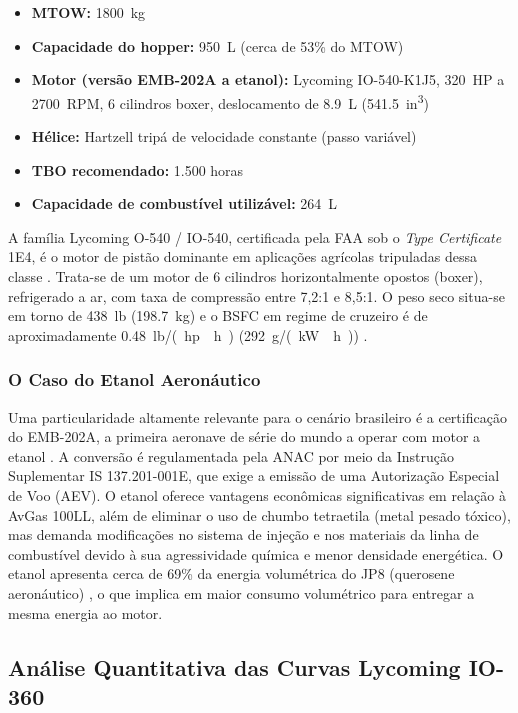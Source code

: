 \documentclass[a4paper,12pt]{article}
\begin{document}
\begin{itemize}
    \item \textbf{MTOW:} \SI{1800}{kg}
    \item \textbf{Capacidade do hopper:} \SI{950}{L} (cerca de 53\% do MTOW)
    \item \textbf{Motor (versão EMB-202A a etanol):} Lycoming IO-540-K1J5, \SI{320}{HP} a \SI{2700}{RPM}, 6 cilindros boxer, deslocamento de \SI{8.9}{L} (\SI{541.5}{in^3})
    \item \textbf{Hélice:} Hartzell tripá de velocidade constante (passo variável)
    \item \textbf{TBO recomendado:} 1.500 horas
    \item \textbf{Capacidade de combustível utilizável:} \SI{264}{L}
\end{itemize}

A família Lycoming O-540 / IO-540, certificada pela FAA sob o \textit{Type Certificate} 1E4, é o motor de pistão dominante em aplicações agrícolas tripuladas dessa classe \cite{lycomingmanual}. Trata-se de um motor de 6 cilindros horizontalmente opostos (boxer), refrigerado a ar, com taxa de compressão entre 7{,}2:1 e 8{,}5:1. O peso seco situa-se em torno de \SI{438}{lb} (\SI{198.7}{kg}) e o BSFC em regime de cruzeiro é de aproximadamente \SI{0.48}{lb/(hp \cdot h)} (\SI{292}{g/(kW \cdot h)}) \cite{lycomingmanual}.

\subsubsection{O Caso do Etanol Aeronáutico}

Uma particularidade altamente relevante para o cenário brasileiro é a certificação do EMB-202A, a primeira aeronave de série do mundo a operar com motor a etanol \cite{embraer202}. A conversão é regulamentada pela ANAC por meio da Instrução Suplementar IS 137.201-001E, que exige a emissão de uma Autorização Especial de Voo (AEV). O etanol oferece vantagens econômicas significativas em relação à AvGas 100LL, além de eliminar o uso de chumbo tetraetila (metal pesado tóxico), mas demanda modificações no sistema de injeção e nos materiais da linha de combustível devido à sua agressividade química e menor densidade energética. O etanol apresenta cerca de 69\% da energia volumétrica do JP8 (querosene aeronáutico) \cite{nas_army_fuels}, o que implica em maior consumo volumétrico para entregar a mesma energia ao motor.

\subsection{Análise Quantitativa das Curvas Lycoming IO-360}
\label{sec:curvas_lycoming}
\end{document}
